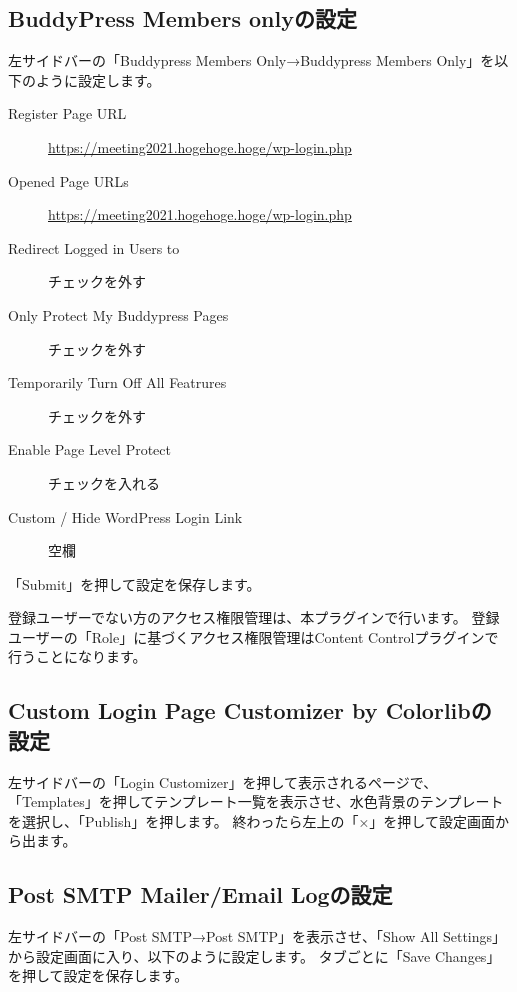 \documentclass[titlepage,10pt,a4paper,uplatex]{jsbook}
\begin{document}
\subsection{BuddyPress Members onlyの設定}

左サイドバーの「Buddypress Members Only→Buddypress Members Only」を以下のように設定します。

\begin{description}
\item[Register Page URL] \url{https://meeting2021.hogehoge.hoge/wp-login.php}
\item[Opened Page URLs] \url{https://meeting2021.hogehoge.hoge/wp-login.php}
\item[Redirect Logged in Users to] チェックを外す
\item[Only Protect My Buddypress Pages] チェックを外す
\item[Temporarily Turn Off All Featrures] チェックを外す
\item[Enable Page Level Protect] チェックを入れる
\item[Custom / Hide WordPress Login Link] 空欄
\end{description}

「Submit」を押して設定を保存します。

登録ユーザーでない方のアクセス権限管理は、本プラグインで行います。
登録ユーザーの「Role」に基づくアクセス権限管理はContent Controlプラグインで行うことになります。

\subsection{Custom Login Page Customizer by Colorlibの設定}

左サイドバーの「Login Customizer」を押して表示されるページで、「Templates」を押してテンプレート一覧を表示させ、水色背景のテンプレートを選択し、「Publish」を押します。
終わったら左上の「×」を押して設定画面から出ます。

\subsection{Post SMTP Mailer/Email Logの設定}

左サイドバーの「Post SMTP→Post SMTP」を表示させ、「Show All Settings」から設定画面に入り、以下のように設定します。
タブごとに「Save Changes」を押して設定を保存します。
\end{document}
